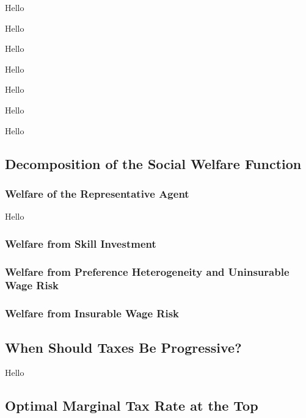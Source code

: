 \documentclass{article}
\begin{document}
{
\proposition Hello

}

{
\corollary Hello

}

{
\corollary Hello

}

{
\corollary Hello

}

{
\corollary Hello

}

{
\corollary Hello

}

{
\corollary Hello

}

\subsection{Decomposition of the Social Welfare Function}

\subsubsection{Welfare of the Representative Agent}

{
\proposition Hello

}

\subsubsection{Welfare from Skill Investment}

\subsubsection{Welfare from Preference Heterogeneity and Uninsurable Wage Risk}

\subsubsection{Welfare from Insurable Wage Risk}


\subsection{When Should Taxes Be Progressive?}

{
\proposition Hello

}

\subsection{Optimal Marginal Tax Rate at the Top}
\end{document}
